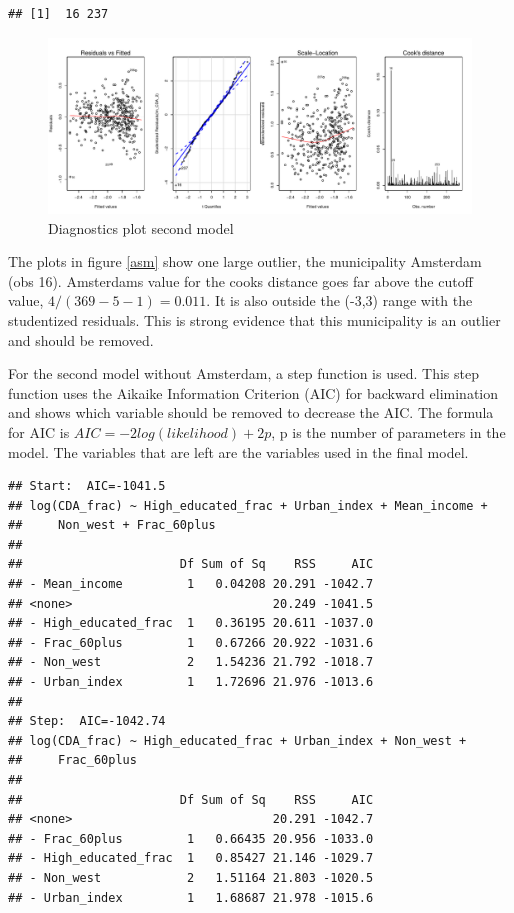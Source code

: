 \documentclass[11pt,]{article}
\begin{document}
\begin{verbatim}
## [1]  16 237
\end{verbatim}

\begin{figure}[H]

{\centering \includegraphics{Report_files/figure-latex/unnamed-chunk-10-1} 

}

\caption{\label{asm}Diagnostics plot second model}\label{fig:unnamed-chunk-10}
\end{figure}

The plots in figure \ref{asm} show one large outlier, the municipality
Amsterdam (obs 16). Amsterdams value for the cooks distance goes far
above the cutoff value, \(4/(369-5-1)=0.011\). It is also outside the
(-3,3) range with the studentized residuals. This is strong evidence
that this municipality is an outlier and should be removed.

For the second model without Amsterdam, a step function is used. This
step function uses the Aikaike Information Criterion (AIC) for backward
elimination and shows which variable should be removed to decrease the
AIC. The formula for AIC is \(AIC=-2log(likelihood)+2p\), p is the
number of parameters in the model. The variables that are left are the
variables used in the final model.

\begin{verbatim}
## Start:  AIC=-1041.5
## log(CDA_frac) ~ High_educated_frac + Urban_index + Mean_income + 
##     Non_west + Frac_60plus
## 
##                      Df Sum of Sq    RSS     AIC
## - Mean_income         1   0.04208 20.291 -1042.7
## <none>                            20.249 -1041.5
## - High_educated_frac  1   0.36195 20.611 -1037.0
## - Frac_60plus         1   0.67266 20.922 -1031.6
## - Non_west            2   1.54236 21.792 -1018.7
## - Urban_index         1   1.72696 21.976 -1013.6
## 
## Step:  AIC=-1042.74
## log(CDA_frac) ~ High_educated_frac + Urban_index + Non_west + 
##     Frac_60plus
## 
##                      Df Sum of Sq    RSS     AIC
## <none>                            20.291 -1042.7
## - Frac_60plus         1   0.66435 20.956 -1033.0
## - High_educated_frac  1   0.85427 21.146 -1029.7
## - Non_west            2   1.51164 21.803 -1020.5
## - Urban_index         1   1.68687 21.978 -1015.6
\end{verbatim}
\end{document}
